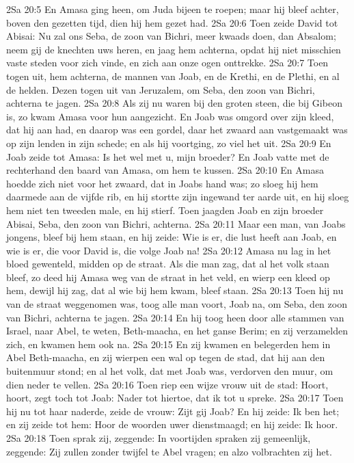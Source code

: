 2Sa 20:5  En Amasa ging heen, om Juda bijeen te roepen; maar hij bleef achter, boven den gezetten tijd, dien hij hem gezet had.
2Sa 20:6  Toen zeide David tot Abisai: Nu zal ons Seba, de zoon van Bichri, meer kwaads doen, dan Absalom; neem gij de knechten uws heren, en jaag hem achterna, opdat hij niet misschien vaste steden voor zich vinde, en zich aan onze ogen onttrekke.
2Sa 20:7  Toen togen uit, hem achterna, de mannen van Joab, en de Krethi, en de Plethi, en al de helden. Dezen togen uit van Jeruzalem, om Seba, den zoon van Bichri, achterna te jagen.
2Sa 20:8  Als zij nu waren bij den groten steen, die bij Gibeon is, zo kwam Amasa voor hun aangezicht. En Joab was omgord over zijn kleed, dat hij aan had, en daarop was een gordel, daar het zwaard aan vastgemaakt was op zijn lenden in zijn schede; en als hij voortging, zo viel het uit.
2Sa 20:9  En Joab zeide tot Amasa: Is het wel met u, mijn broeder? En Joab vatte met de rechterhand den baard van Amasa, om hem te kussen.
2Sa 20:10  En Amasa hoedde zich niet voor het zwaard, dat in Joabs hand was; zo sloeg hij hem daarmede aan de vijfde rib, en hij stortte zijn ingewand ter aarde uit, en hij sloeg hem niet ten tweeden male, en hij stierf. Toen jaagden Joab en zijn broeder Abisai, Seba, den zoon van Bichri, achterna.
2Sa 20:11  Maar een man, van Joabs jongens, bleef bij hem staan, en hij zeide: Wie is er, die lust heeft aan Joab, en wie is er, die voor David is, die volge Joab na!
2Sa 20:12  Amasa nu lag in het bloed gewenteld, midden op de straat. Als die man zag, dat al het volk staan bleef, zo deed hij Amasa weg van de straat in het veld, en wierp een kleed op hem, dewijl hij zag, dat al wie bij hem kwam, bleef staan.
2Sa 20:13  Toen hij nu van de straat weggenomen was, toog alle man voort, Joab na, om Seba, den zoon van Bichri, achterna te jagen.
2Sa 20:14  En hij toog heen door alle stammen van Israel, naar Abel, te weten, Beth-maacha, en het ganse Berim; en zij verzamelden zich, en kwamen hem ook na.
2Sa 20:15  En zij kwamen en belegerden hem in Abel Beth-maacha, en zij wierpen een wal op tegen de stad, dat hij aan den buitenmuur stond; en al het volk, dat met Joab was, verdorven den muur, om dien neder te vellen.
2Sa 20:16  Toen riep een wijze vrouw uit de stad: Hoort, hoort, zegt toch tot Joab: Nader tot hiertoe, dat ik tot u spreke.
2Sa 20:17  Toen hij nu tot haar naderde, zeide de vrouw: Zijt gij Joab? En hij zeide: Ik ben het; en zij zeide tot hem: Hoor de woorden uwer dienstmaagd; en hij zeide: Ik hoor.
2Sa 20:18  Toen sprak zij, zeggende: In voortijden spraken zij gemeenlijk, zeggende: Zij zullen zonder twijfel te Abel vragen; en alzo volbrachten zij het.
